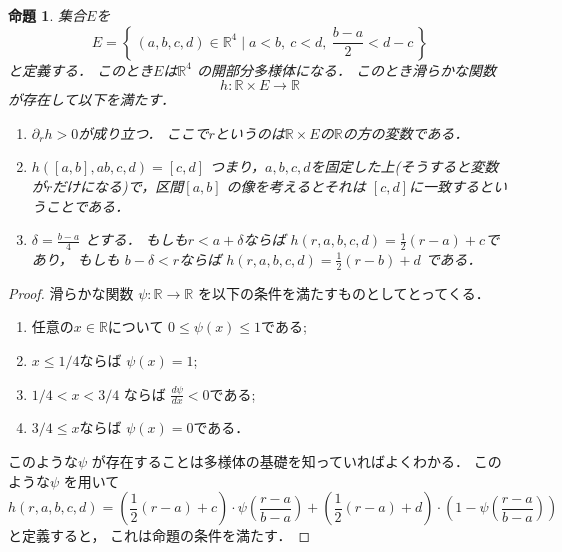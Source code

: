 \documentclass[leqno, a4paper, 12pt, dvipdfmx]{jsarticle}
\newtheorem{prop}[thm]{命題}
\newcommand{\rr}{\mathbb{R}}
\begin{document}
\begin{prop}\label{prop:eee}
集合$E$を
\[
E=\left\{\, (a, b, c, d)\in \rr^{4}\mid a<b,\  c<d, \ \frac{b-a}{2}<d-c\, \right\}
\]
と定義する．
このとき$E$は$\rr^{4}$
の開部分多様体になる．
このとき滑らかな関数
\[
h\colon \rr\times E\to \rr
\]
が存在して以下を満たす．
\begin{enumerate}[label=\textup{(\arabic*)}]
\item 
$\partial_{r}h>0$が成り立つ．
ここで$r$というのは$\rr\times E$の$\rr$の方の変数である．
\item 
$h([a, b], ab, c, d)=[c, d]$
つまり，$a, b, c, d$を固定した上(そうすると変数が$r$だけになる)で，区間$[a, b]$
の像を考えるとそれは
$[c, d]$に一致するということである．

\item 
$\delta=\frac{b-a}{4}$
とする．
もしも$r<a+\delta$ならば
$h(r, a, b, c, d)=\frac{1}{2}(r-a)+c$であり，
もしも
$b-\delta<r$ならば
$h(r, a, b, c, d)=\frac{1}{2}(r-b)+d$
である．
\end{enumerate}
\end{prop}
\begin{proof}
滑らかな関数
$\psi\colon \rr\to \rr$
を以下の条件を満たすものとしてとってくる．
\begin{enumerate}[label=\textup{(\arabic*)}]
\item 
任意の$x\in \rr$について
$0\le \psi(x)\le 1$である; 


\item 
$x\le 1/4$ならば
$\psi(x)=1$; 

\item 
$1/4<x<3/4$
ならば
$\frac{d\psi}{dx}<0$である; 

\item 
$3/4\le x$ならば
$\psi(x)=0$である．
\end{enumerate}
このような$\psi$
が存在することは多様体の基礎を知っていればよくわかる．
このような$\psi$
を用いて
\[
h(r, a, b, c, d)
=
\left(\frac{1}{2}(r-a)+c\right)\cdot \psi\left(\frac{r-a}{b-a}\right)
+
\left(\frac{1}{2}(r-a)+d\right)\cdot \left(1-\psi\left(\frac{r-a}{b-a}\right)\right)
\]
と定義すると，
これは命題の条件を満たす．
\end{proof}
\end{document}
